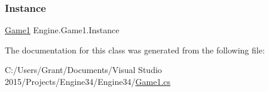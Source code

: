 \subsubsection{\texorpdfstring{Instance}{Instance}}
{\footnotesize\ttfamily \hyperlink{a00040}{Game1} Engine.\+Game1.\+Instance\hspace{0.3cm}{\ttfamily [static]}}



The documentation for this class was generated from the following file\+:\begin{DoxyCompactItemize}
\item 
C\+:/\+Users/\+Grant/\+Documents/\+Visual Studio 2015/\+Projects/\+Engine34/\+Engine34/\hyperlink{a00008}{Game1.\+cs}\end{DoxyCompactItemize}
